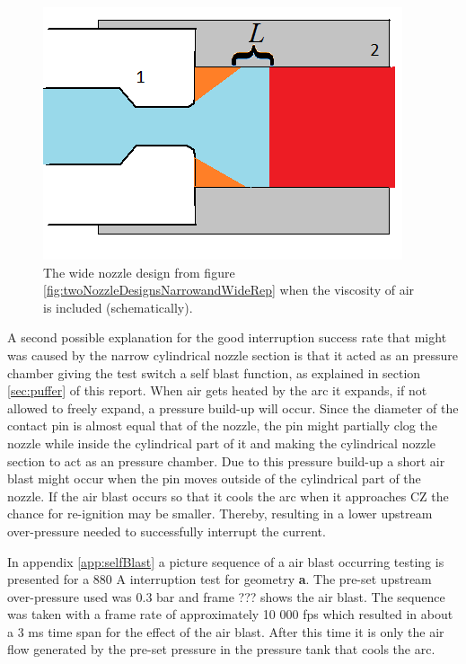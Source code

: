 \documentclass[10pt,b5paper,twoside]{article}
\begin{document}
\begin{figure}[H]
\centering
\includegraphics[scale=0.45]{Bilder/Results/nozzle_cooling_2_only_a.png}
\caption{The wide nozzle design from figure \ref{fig:twoNozzleDesignsNarrowandWideRep} when the viscosity of air is included (schematically).} \label{fig:twoNozzleDesignsNarrowandWideRep_MIX}
\end{figure}

A second possible explanation for the good interruption success rate that might was caused by the narrow cylindrical nozzle section is that it acted as an pressure chamber giving the test switch a self blast function, as explained in section \ref{sec:puffer} of this report. When air gets heated by the arc it expands, if not allowed to freely expand, a pressure build-up will occur. Since the diameter of the contact pin is almost equal that of the nozzle, the pin might partially clog the nozzle while inside the cylindrical part of it and making the cylindrical nozzle section to act as an pressure chamber. Due to this pressure build-up a short air blast might occur when the pin moves outside of the cylindrical part of the nozzle. If the air blast occurs so that it cools the arc when it approaches CZ the chance for re-ignition may be smaller. Thereby, resulting in a lower upstream over-pressure needed to successfully interrupt the current. 

In appendix \ref{app:selfBlast} a picture sequence of a air blast occurring testing is presented for a 880 A interruption test for geometry \textbf{a}. The pre-set upstream over-pressure used was 0.3 bar and frame ??? shows the air blast. The sequence was taken with a frame rate of approximately 10 000 fps which resulted in about a 3 ms time span for the effect of the air blast. After this time it is only the air flow generated by the pre-set pressure in the pressure tank that cools the arc.
\end{document}
